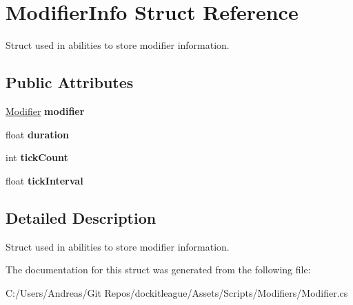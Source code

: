 \hypertarget{struct_modifier_info}{}\section{Modifier\+Info Struct Reference}
\label{struct_modifier_info}


Struct used in abilities to store modifier information.  


\subsection*{Public Attributes}
\begin{DoxyCompactItemize}
\item 
\hypertarget{struct_modifier_info_a38108c5561e856f04d94f3c202c9c52b}{}\label{struct_modifier_info_a38108c5561e856f04d94f3c202c9c52b} 
\hyperlink{class_modifier}{Modifier} {\bfseries modifier}
\item 
\hypertarget{struct_modifier_info_ab63c196fbcc48f43ac5a022c095cac96}{}\label{struct_modifier_info_ab63c196fbcc48f43ac5a022c095cac96} 
float {\bfseries duration}
\item 
\hypertarget{struct_modifier_info_a22adfa22f1eea819a810f2ac2379aa78}{}\label{struct_modifier_info_a22adfa22f1eea819a810f2ac2379aa78} 
int {\bfseries tick\+Count}
\item 
\hypertarget{struct_modifier_info_a18b683acdaa6e2540908e37d612c0f53}{}\label{struct_modifier_info_a18b683acdaa6e2540908e37d612c0f53} 
float {\bfseries tick\+Interval}
\end{DoxyCompactItemize}


\subsection{Detailed Description}
Struct used in abilities to store modifier information. 



The documentation for this struct was generated from the following file\+:\begin{DoxyCompactItemize}
\item 
C\+:/\+Users/\+Andreas/\+Git Repos/dockitleague/\+Assets/\+Scripts/\+Modifiers/Modifier.\+cs\end{DoxyCompactItemize}
